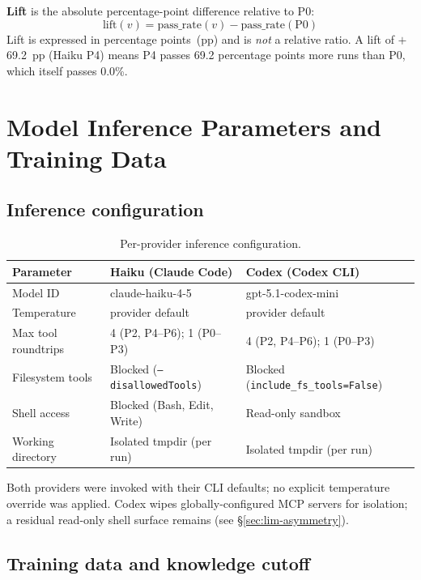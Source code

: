 \documentclass[10pt,a4paper,twocolumn]{article}
\begin{document}
\textbf{Lift} is the absolute percentage-point difference relative to P0:
\[
  \text{lift}(v) = \text{pass\_rate}(v) - \text{pass\_rate}(\text{P0})
\]
Lift is expressed in percentage points~(pp) and is \emph{not} a relative ratio.
A lift of $+$69.2~pp (Haiku P4) means P4 passes 69.2 percentage points more runs than P0, which itself passes 0.0\%.

\section{Model Inference Parameters and Training Data}
\label{app:model-details}

\subsection*{Inference configuration}

\begin{table}[h]
\centering
\caption{Per-provider inference configuration.}
\label{tab:inference-params}
\small
\begin{tabular}{@{}lll@{}}
\toprule
\textbf{Parameter} & \textbf{Haiku (Claude Code)} & \textbf{Codex (Codex CLI)} \\
\midrule
Model ID              & claude-haiku-4-5              & gpt-5.1-codex-mini \\
Temperature           & provider default              & provider default \\
Max tool roundtrips   & 4 (P2, P4--P6); 1 (P0--P3)   & 4 (P2, P4--P6); 1 (P0--P3) \\
Filesystem tools      & Blocked (\texttt{--disallowedTools}) & Blocked (\texttt{include\_fs\_tools=False}) \\
Shell access          & Blocked (Bash, Edit, Write)   & Read-only sandbox \\
Working directory     & Isolated tmpdir (per run)     & Isolated tmpdir (per run) \\
\bottomrule
\end{tabular}
\end{table}

Both providers were invoked with their CLI defaults; no explicit temperature override was applied.
Codex wipes globally-configured MCP servers for isolation; a residual read-only shell surface remains (see \S\ref{sec:lim-asymmetry}).

\subsection*{Training data and knowledge cutoff}
\end{document}
